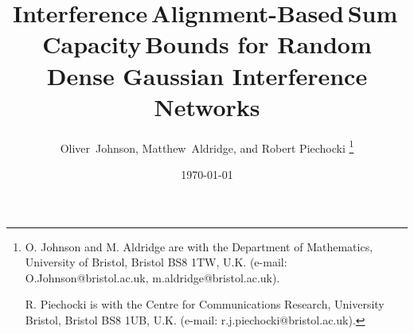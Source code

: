 \documentclass[journal]{IEEEtran}
\begin{document}
\title{Interference\,Alignment-Based\,Sum\,Capacity\,Bounds for Random Dense Gaussian
Interference Networks}
\author{
Oliver~Johnson, Matthew~Aldridge, and Robert Piechocki
\thanks{O. Johnson and M. Aldridge are with the Department of Mathematics, University
of Bristol, Bristol BS8 1TW, U.K. (e-mail: O.Johnson@bristol.ac.uk,
m.aldridge@bristol.ac.uk).

R. Piechocki is with the Centre for Communications Research, University
Bristol, Bristol BS8 1UB, U.K. (e-mail: r.j.piechocki@bristol.ac.uk).}
}
\date{\today}
\maketitle

\renewcommand\labelenumi{(\roman{enumi})}
\renewcommand\theenumi{(\roman{enumi})}
\newtheorem{theorem}{Theorem}[section]
\newtheorem{lemma}[theorem]{Lemma}
\newtheorem{proposition}[theorem]{Proposition}
\newtheorem{corollary}[theorem]{Corollary}
\newtheorem{conjecture}[theorem]{Conjecture}
\newtheorem{definition}[theorem]{Definition}
\newtheorem{example}[theorem]{Example}
\newtheorem{condition}{Condition}
\newtheorem{main}{Theorem}
\newtheorem{remark}[theorem]{Remark}





\newcommand{\vc}[1]{{\mathbf{ #1}}}
\newcommand{\var}{{\rm{Var\;}}}
\newcommand{\cov}{{\rm{Cov\;}}}
\newcommand{\tends}{\rightarrow \infty}
\newcommand{\C}{{\cal C}}
\newcommand{\ep}{{\mathbb {E}}}
\newcommand{\pr}{{\mathbb {P}}}
\newcommand{\re}{{\mathbb {R}}}
\newcommand{\I}{\mathbb {I}}
\newcommand{\Z}{{\mathbb {Z}}}
\newcommand{\Nat}{{\mathbb {N}}}

\newcommand{\blah}[1]{}

\newcommand{\AAA}{{\mathcal{A}}}
\newcommand{\BBB}{{\mathcal{B}}}
\newcommand{\D}{{\mathcal{D}}}
\newcommand{\SSC}{{\mathcal{S}}}
\newcommand{\SSspine}{{\mathcal{S}}_{\rm spine}}
\newcommand{\SSedge}{{\mathcal{S}}_{\rm edge}}
\newcommand{\SSbody}{{\mathcal{S}}_{\rm body}}
\newcommand{\TTC}{\overline{\mathcal{S}}}
\newcommand{\RR}{{\mathcal{R}}}
\newcommand{\TT}{{\mathcal{T}}}
\newcommand{\SNR}{{\rm{SNR}}}
\newcommand{\INR}{{\rm{INR}}}
\newcommand{\R}[1]{R[#1]}
\newcommand{\RC}[1]{R_C[#1]}
\newcommand{\RS}[1]{R^*[#1]}
\newcommand{\bino}{{\rm{Bin}}}
\newcommand{\csum}{C_{\Sigma}}
\newcommand{\euc}{d}
\newcommand{\half}{\frac{1}{2}}
\newcommand{\ol}[1]{\overline{#1}}
\newcommand{\csep}{C_{\rm{sep}}}
\newcommand{\dsep}{D_{\rm{sep}}}
\newcommand{\cdec}{C_{\rm{dec}}}
\newcommand{\Fsnr}{F_{S}}
\newcommand{\Fdis}{F_{\euc}}
\newcommand{\fdis}{f_{\euc}}
\newcommand{\idc}[2]{\vc{#1},\vc{#2}}
\newcommand{\B}[2]{B_{\idc{#1}{#2}}}
\newcommand{\pB}[2]{p_{\idc{#1}{#2}}}
\newcommand{\prj}[1]{\Pi_{\vc{#1}}}
\end{document}
